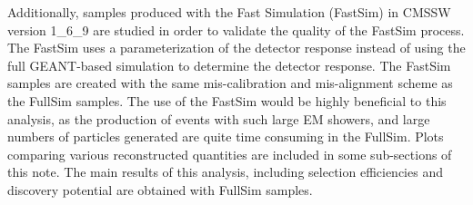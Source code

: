 Additionally, samples produced with the Fast Simulation (FastSim) in CMSSW version 1\_6\_9 are 
studied in order to validate the quality of the FastSim process. The FastSim uses a parameterization 
of the detector response instead of using the full GEANT-based simulation to determine the detector response.
The FastSim samples are created with the same mis-calibration and mis-alignment scheme as the FullSim samples. 
The use of the FastSim would be highly beneficial to this analysis, as the production of events with such large EM showers, and large numbers of particles generated 
are quite time consuming in the FullSim.  
Plots comparing various reconstructed quantities are included in some sub-sections of this note.  
The main results of this analysis, including selection efficiencies and discovery potential are obtained with FullSim samples.

